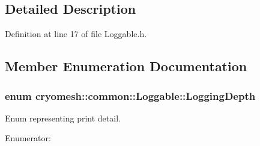 \subsection{\-Detailed \-Description}


\-Definition at line 17 of file \-Loggable.\-h.



\subsection{\-Member \-Enumeration \-Documentation}
\hypertarget{classcryomesh_1_1common_1_1Loggable_a4d85401f6c81bc8ed94e49d66ae574c5}{
\subsubsection[{\-Logging\-Depth}]{\setlength{\rightskip}{0pt plus 5cm}enum {\bf cryomesh\-::common\-::\-Loggable\-::\-Logging\-Depth}}}\label{classcryomesh_1_1common_1_1Loggable_a4d85401f6c81bc8ed94e49d66ae574c5}


\-Enum representing print detail. 

\begin{Desc}
\item[\-Enumerator\-: ]\par
\begin{description}
\item[{\em 
\hypertarget{classcryomesh_1_1common_1_1Loggable_a4d85401f6c81bc8ed94e49d66ae574c5a51f5abcf5a53a8930a09b065fc64a44f}{\-S\-U\-M\-M\-A\-R\-Y}\label{classcryomesh_1_1common_1_1Loggable_a4d85401f6c81bc8ed94e49d66ae574c5a51f5abcf5a53a8930a09b065fc64a44f}
}]\item[{\em 
\hypertarget{classcryomesh_1_1common_1_1Loggable_a4d85401f6c81bc8ed94e49d66ae574c5ae496af0b41e3b64530b61e315822cc51}{\-M\-A\-X}\label{classcryomesh_1_1common_1_1Loggable_a4d85401f6c81bc8ed94e49d66ae574c5ae496af0b41e3b64530b61e315822cc51}
}]\end{description}
\end{Desc}



